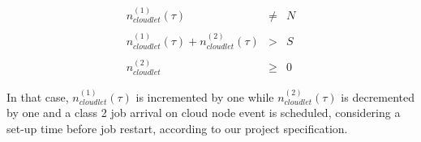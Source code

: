 \documentclass[10pt,a4paper]{article}
\begin{document}
\begin{equation}
\begin{array} {rcl} 

n_{cloudlet}^{(1)}(\tau) & \neq & N \\\\

n_{cloudlet}^{(1)}(\tau) + n_{cloudlet}^{(2)}(\tau) & > & S \\\\

n_{cloudlet}^{(2)} & \geqslant & 0

\end{array}
\end{equation}

In that case, $n_{cloudlet}^{(1)}(\tau)$ is incremented by one while $n_{cloudlet}^{(2)}(\tau)$ is decremented by one and a class 2 job arrival on cloud node event is scheduled, considering a set-up time before job restart, according to our project specification.
 
\end{document}
